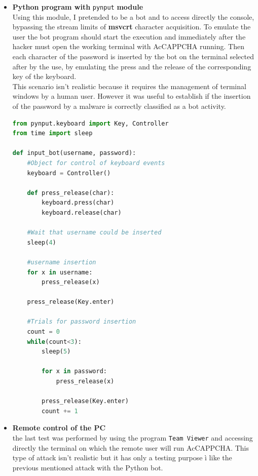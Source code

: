 \begin{itemize}
{\begin{lstlisting}[language=python, showstringspaces=false, tabsize=4, basicstyle=\footnotesize, caption={\footnotesize{Bot using popen.}},label={Results:popen_bot}]
    #Wait until username could be inserted
    sleep(4)
    #Write username and password
    credentials = username.encode() + b'\r\n' + \
    			  password.encode() + b'\r\n'
    output = process.communicate(credentials)[0]
    
    print(output.decode())
\end{lstlisting}
}
\item{\textbf{Python program with} \texttt{pynput} \textbf{module}\\
Using this module, I pretended to be a bot and to access directly the console, bypassing the stream limits of \textbf{msvcrt} character acquisition. To emulate the user the bot program should start the execution and immediately after the hacker must open the working terminal with AcCAPPCHA running. Then each character of the password is inserted by the bot on the terminal selected after by the use, by emulating the press and the release of the corresponding key of the keyboard.\\
This scenario isn't realistic because it requires the management of terminal windows by a human user. However it was useful to establish if the insertion of the password by a malware is correctly classified as a bot activity.
\begin{lstlisting}[language=python, showstringspaces=false, tabsize=4, basicstyle=\footnotesize, caption={\footnotesize{Bot using pynput module.}},label={Results:pynput_bot}]
from pynput.keyboard import Key, Controller
from time import sleep

def input_bot(username, password):
    #Object for control of keyboard events
    keyboard = Controller()

    def press_release(char):
        keyboard.press(char)
        keyboard.release(char)

    #Wait that username could be inserted
    sleep(4)

    #username insertion
    for x in username:
        press_release(x)
    
    press_release(Key.enter)

    #Trials for password insertion
    count = 0
    while(count<3):
        sleep(5)
        
        for x in password:
            press_release(x)

        press_release(Key.enter)
        count += 1
\end{lstlisting}
}
\item{\textbf{Remote control of the PC}\\
the last test was performed by using the program \texttt{Team Viewer} and accessing directly the terminal on which the remote user will run AcCAPPCHA. This type of attack isn't realistic but it has only a testing purpose ì like the previous mentioned attack with the Python bot.}
\end{itemize}
